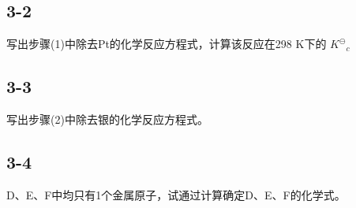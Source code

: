 \subsection*{3-2}
写出步骤(1)中除去Pt的化学反应⽅程式，计算该反应在298 K下的 $K ^ { \ominus } { } _ { c }$

\subsection*{3-3}
写出步骤(2)中除去银的化学反应⽅程式。

\subsection*{3-4}
D、E、F中均只有1个⾦属原⼦，试通过计算确定D、E、F的化学式。

